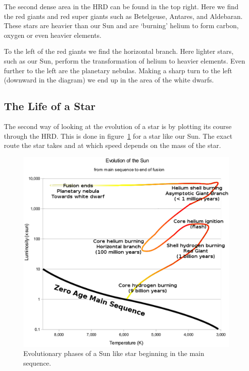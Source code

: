 \documentclass[12pt,a4paper]{article}
\numberwithin{equation}{section}
\numberwithin{figure}{section}
\numberwithin{table}{section}
\begin{document}
The second dense area in the HRD can be found in the top right. Here we find the red giants and red super giants such as Betelgeuse, Antares, and Aldebaran. These stars are heavier than our Sun and are `burning' helium to form carbon, oxygen or even heavier elements.

To the left of the red giants we find the horizontal branch. Here lighter stars, such as our Sun, perform the transformation of helium to heavier elements. Even further to the left are the planetary nebulas. Making a sharp turn to the left (downward in the diagram) we end up in the area of the white dwarfs.

\subsection{The Life of a Star}
The second way of looking at the evolution of a star is by plotting its course through the HRD. This is done in figure~\ref{fig:HRD_2} for a star like our Sun. The exact route the star takes and at which speed depends on the mass of the star.

\begin{figure}\begin{center}
\includegraphics[scale=0.7]{Evolution_of_a_sun-like_star.eps}
\caption{Evolutionary phases of a Sun like star beginning in the main sequence.\protect\footnotemark}\label{fig:HRD_2}
\end{center}\end{figure}
\end{document}
